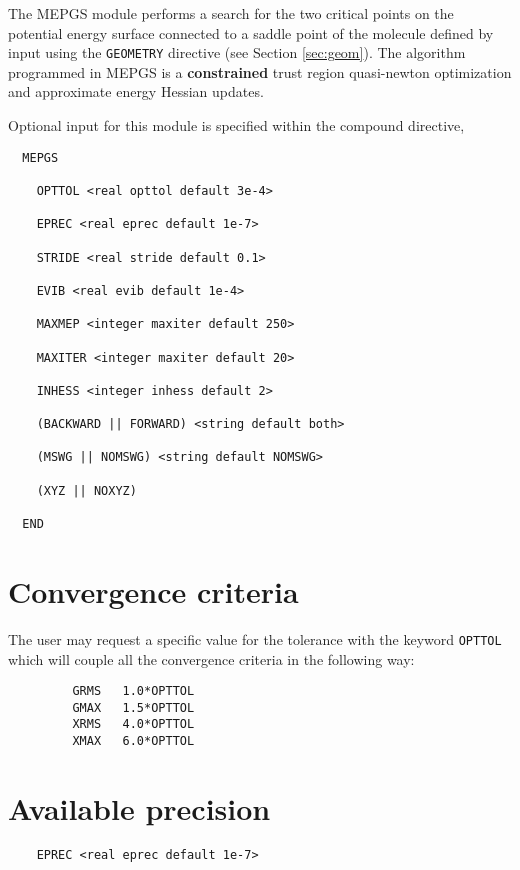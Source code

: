 %
%
\label{sec:mepgs}


The MEPGS module performs a search for the two critical points on the
potential energy surface connected to a saddle point of the molecule 
defined by input using the \verb+GEOMETRY+ directive (see Section \ref{sec:geom}). 
The algorithm programmed in MEPGS is a {\bf constrained} trust region quasi-newton optimization and approximate energy Hessian updates.


Optional input for this module is specified within the compound
directive,
\begin{verbatim}
  MEPGS 

    OPTTOL <real opttol default 3e-4>

    EPREC <real eprec default 1e-7>

    STRIDE <real stride default 0.1>

    EVIB <real evib default 1e-4>

    MAXMEP <integer maxiter default 250>

    MAXITER <integer maxiter default 20>

    INHESS <integer inhess default 2>

    (BACKWARD || FORWARD) <string default both>

    (MSWG || NOMSWG) <string default NOMSWG>

    (XYZ || NOXYZ) 

  END
\end{verbatim}

\sloppy

\section{Convergence criteria}

The user may request a specific value for the tolerance with the keyword \verb+OPTTOL+ which will couple all the convergence criteria in the following way:

\begin{verbatim}
         GRMS   1.0*OPTTOL
         GMAX   1.5*OPTTOL
         XRMS   4.0*OPTTOL
         XMAX   6.0*OPTTOL
\end{verbatim}

\section{Available precision}

\begin{verbatim}
    EPREC <real eprec default 1e-7>
\end{verbatim}

